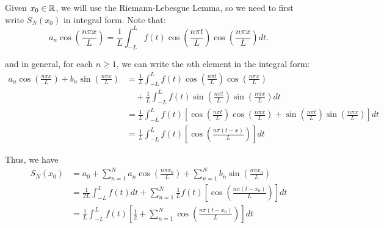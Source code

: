 \documentclass[class=article,crop=false]{standalone}
\begin{document}
\begin{prf}
	Given $x_0 \in \mathbb{R}$, we will use the Riemann-Lebesgue Lemma, so we need to first write $S_N(x_0)$ in integral form. Note that:
	\[
		a_n \cos \left( \frac{ n\pi x}{ L} \right) = \frac{1}{L} \int_{-L}^{L} f(t) \cos \left( \frac{ n\pi t}{ L} \right) \cos \left( \frac{ n\pi x}{ L} \right) dt 
	.\] 

and in general, for each $n \geq 1$, we can write the $n$th element in the integral form:
 \begin{align*}
	 a_n \cos \left( \frac{ n\pi x}{ L} \right) + b_n \sin \left( \frac{ n\pi x}{ L} \right) &= \frac{1}{L} \int_{-L}^{L} f(t) \cos \left( \frac{ n\pi t}{ L} \right) \cos \left( \frac{ n\pi x}{ L} \right) \\
	 &\quad  + \frac{1}{L} \int_{-L}^{L} f(t) \sin \left( \frac{ n\pi t}{ L} \right) \sin \left( \frac{ n\pi x}{ L} \right) dt   \\
	&= \frac{1}{L}\int_{-L}^{L} f(t) \left[ \cos \left( \frac{ n\pi t}{ L} \right) \cos \left( \frac{ n\pi x}{ L} \right) + \sin \left( \frac{ n\pi t}{ L} \right) \sin \left( \frac{ n\pi x}{ L} \right)  \right]dt  \\ 
	&=  \frac{1}{L}\int_{-L}^{L} f(t) \left[ \cos \left( \frac{ n\pi (t-x)}{ L} \right)  \right] dt  
\end{align*}

Thus, we have
\begin{align*}
	S_N(x_0) &= a_0 + \sum_{ n=1}^{ N} a_n \cos \left( \frac{ n\pi x_0}{ L} \right) + \sum_{ n=1}^{ N} b_n \sin \left( \frac{ n\pi x_0}{ L} \right)  \\
		 &= \frac{1}{2L} \int_{-L}^{L} f(t) dt + \sum_{ n=1}^{ N} \frac{1}{L} f(t) \left[ \cos \left( \frac{ n\pi (t-x_0)}{ L} \right)  \right]  dt \\
		 &= \frac{1}{L} \int_{-L}^{L} f(t) \left[ \frac{1}{2} + \sum_{ n=1}^{ N} \cos \left( \frac{ n\pi (t-x_0)}{ L} \right)  \right] dt  
\end{align*}



\end{prf}
\end{document}
